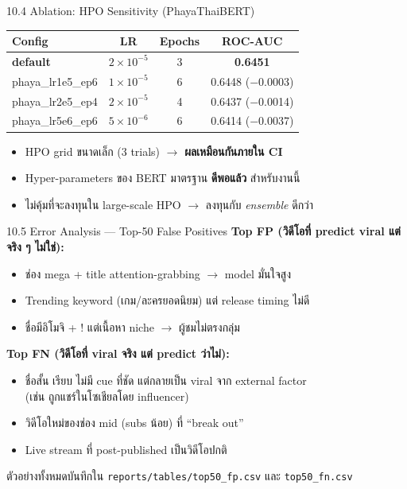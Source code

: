 \documentclass[aspectratio=169,11pt,xcolor=dvipsnames]{beamer}
\newcommand{\hl}[1]{\textcolor{kmitlOrange}{\textbf{#1}}}
\begin{document}
\begin{frame}{10.4 Ablation: HPO Sensitivity (PhayaThaiBERT)}
  \begin{center}
    \begin{tabular}{lccc}
      \toprule
      \textbf{Config} & \textbf{LR} & \textbf{Epochs} & \textbf{ROC-AUC}\\
      \midrule
      \hl{default} & $2 \times 10^{-5}$ & 3 & \textbf{0.6451}\\
      phaya\_lr1e5\_ep6 & $1 \times 10^{-5}$ & 6 & 0.6448 ($-$0.0003)\\
      phaya\_lr2e5\_ep4 & $2 \times 10^{-5}$ & 4 & 0.6437 ($-$0.0014)\\
      phaya\_lr5e6\_ep6 & $5 \times 10^{-6}$ & 6 & 0.6414 ($-$0.0037)\\
      \bottomrule
    \end{tabular}
  \end{center}
  \vspace{0.4em}
  \begin{itemize}
    \item HPO grid ขนาดเล็ก (3 trials) $\rightarrow$ \hl{ผลเหมือนกันภายใน CI}
    \item Hyper-parameters ของ BERT มาตรฐาน \hl{ดีพอแล้ว} สำหรับงานนี้
    \item ไม่คุ้มที่จะลงทุนใน large-scale HPO $\rightarrow$ ลงทุนกับ \emph{ensemble} ดีกว่า
  \end{itemize}
\end{frame}

\begin{frame}{10.5 Error Analysis — Top-50 False Positives}
  \textbf{Top FP (วิดีโอที่ predict viral แต่จริง ๆ ไม่ใช่):}
  \begin{itemize}
    \item ช่อง mega + title attention-grabbing $\rightarrow$ model มั่นใจสูง
    \item Trending keyword (เกม/ละครยอดนิยม) แต่ release timing ไม่ดี
    \item ชื่อมีอิโมจิ + ! แต่เนื้อหา niche $\rightarrow$ ผู้ชมไม่ตรงกลุ่ม
  \end{itemize}
  \vspace{0.4em}
  \textbf{Top FN (วิดีโอที่ viral จริง แต่ predict ว่าไม่):}
  \begin{itemize}
    \item ชื่อสั้น เรียบ ไม่มี cue ที่ชัด แต่กลายเป็น viral จาก external factor\\
      (เช่น ถูกแชร์ในโซเชียลโดย influencer)
    \item วิดีโอใหม่ของช่อง mid (subs น้อย) ที่ ``break out''
    \item Live stream ที่ post-published เป็นวิดีโอปกติ
  \end{itemize}
  \vspace{0.3em}
  \begin{center}
    \scriptsize ตัวอย่างทั้งหมดบันทึกใน \texttt{reports/tables/top50\_fp.csv} และ \texttt{top50\_fn.csv}
  \end{center}
\end{frame}
\end{document}

